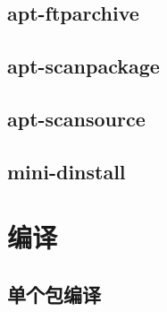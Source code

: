 \documentclass[a4paper,10pt]{article}
\begin{document}
\begin{CJK}{UTF8}{gbsn}
\section{apt-ftparchive}
\subsection{}
\subsubsection{}

\section{apt-scanpackage}
\subsection{}
\subsubsection{}

\section{apt-scansource}
\subsection{}
\subsubsection{}

\section{mini-dinstall}
\subsection{}
\subsubsection{}

\chapter{编译}
\section{单个包编译}

\end{CJK}
\end{document}
